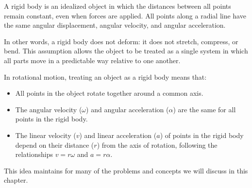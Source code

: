 A rigid body is an idealized object in which the distances between all points remain constant, even when forces are applied. All points along a radial line have the same angular displacement, angular velocity, and angular acceleration.

In other words, a rigid body does not deform: it does not stretch, compress, or bend. This assumption allows the object to be treated as a single system in which all parts move in a predictable way relative to one another.

In rotational motion, treating an object as a rigid body means that:

\begin{itemize}
  \item All points in the object rotate together around a common axis.
  \item The angular velocity ($\omega$) and angular acceleration ($\alpha$) are the same for all points in the rigid body.
  \item The linear velocity ($v$) and linear acceleration ($a$) of points in the rigid body depend on their distance ($r$) from the axis of rotation, following the relationships $v = r\omega$ and $a = r\alpha $.
\end{itemize}

This idea maintains for many of the problems and concepts we will discuss in this chapter.
